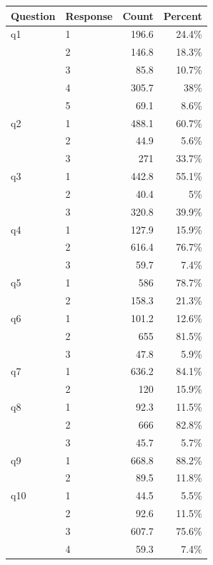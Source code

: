 \begin{tabular}{p{6cm}lrr}
\hline
\textbf{Question} & \textbf{Response} & \textbf{Count} & \textbf{Percent} \\
\hline
q1 & 1 & 196.6 & 24.4\% \\
  & 2 & 146.8 & 18.3\% \\
  & 3 & 85.8 & 10.7\% \\
  & 4 & 305.7 & 38\% \\
  & 5 & 69.1 & 8.6\% \\
q2 & 1 & 488.1 & 60.7\% \\
  & 2 & 44.9 & 5.6\% \\
  & 3 & 271 & 33.7\% \\
q3 & 1 & 442.8 & 55.1\% \\
  & 2 & 40.4 & 5\% \\
  & 3 & 320.8 & 39.9\% \\
q4 & 1 & 127.9 & 15.9\% \\
  & 2 & 616.4 & 76.7\% \\
  & 3 & 59.7 & 7.4\% \\
q5 & 1 & 586 & 78.7\% \\
  & 2 & 158.3 & 21.3\% \\
q6 & 1 & 101.2 & 12.6\% \\
  & 2 & 655 & 81.5\% \\
  & 3 & 47.8 & 5.9\% \\
q7 & 1 & 636.2 & 84.1\% \\
  & 2 & 120 & 15.9\% \\
q8 & 1 & 92.3 & 11.5\% \\
  & 2 & 666 & 82.8\% \\
  & 3 & 45.7 & 5.7\% \\
q9 & 1 & 668.8 & 88.2\% \\
  & 2 & 89.5 & 11.8\% \\
q10 & 1 & 44.5 & 5.5\% \\
  & 2 & 92.6 & 11.5\% \\
  & 3 & 607.7 & 75.6\% \\
  & 4 & 59.3 & 7.4\% \\
\hline
\end{tabular}
